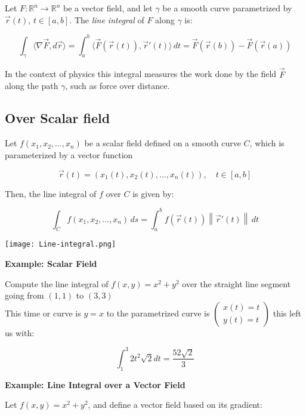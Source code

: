 Let \( F : \mathbb{R}^n \to \mathbb{R}^n \) be a vector field, and let \( \gamma \) be a smooth curve parametrized by \( \vec{r}(t) \), \( t \in [a, b] \). The \emph{line integral} of \( F \) 
along \( \gamma \) is:

\[
\int_\gamma \langle \nabla \vec{F}, d\vec{r} \rangle = \int_a^b \langle \vec{F}(\vec{r}(t)), \vec{r}'(t) \rangle \, dt = \vec{F}(\vec{r}(b)) - \vec{F}(\vec{r}(a))
\]

In the context of physics this integral measures the work done by the field \( \vec{F} \) along the path \( \gamma \), such as force over distance.

\subsection{Over Scalar field}

Let \( f(x_1, x_2, \ldots, x_n) \) be a scalar field defined on a smooth curve \( C \), which is parameterized by a vector function

\[
\vec{r}(t) = (x_1(t), x_2(t), \ldots, x_n(t)), \quad t \in [a, b]
\]

Then, the line integral of \( f \) over \( C \) is given by:

\[
\int_C f(x_1, x_2, \ldots, x_n) \, ds = \int_a^b f(\vec{r}(t)) \left\| \vec{r}'(t) \right\| \, dt
\]


\begin{center}
    \texttt{[image: Line-integral.png]}
\end{center}

\textbf{Example: Scalar Field}
\vspace{\baselineskip}

Compute the line integral of \(f(x,y) = x^2 + y^2\) over the straight line segment going
from \((1,1)\) to \((3,3)\)
\\
This time or curve is \(y = x\) to the parametrized curve is \(\begin{pmatrix}
    x(t) = t \\ y(t) = t
\end{pmatrix}\) this left us with:

\[
\int_{1}^{3}  2t^2 \sqrt{2}dt = \frac{52\sqrt{2}}{3} 
\]

\textbf{Example: Line Integral over a Vector Field}
\vspace{\baselineskip}

Let \( f(x, y) = x^2 + y^2 \), and define a vector field based on its gradient:

